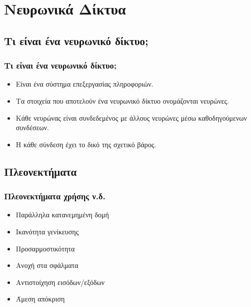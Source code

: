 \documentclass[xetex,serif,mathserif,14pt]{beamer}
\begin{document}

\section{Νευρωνικά Δίκτυα} %

\subsection{Τι είναι ένα νευρωνικό δίκτυο;}

\begin{frame}
\frametitle{Τι είναι ένα νευρωνικό δίκτυο;}
\begin{itemize}
  \item Είναι ένα σύστημα επεξεργασίας πληροφοριών.\pause
  \item Τα στοιχεία που αποτελούν ένα νευρωνικό δίκτυο ονομάζονται νευρώνες.\pause
  \item Κάθε νευρώνας είναι συνδεδεμένος με άλλους νευρώνες μέσω  καθοδηγούμενων  συνδέσεων.\pause
  \item  Η κάθε σύνδεση έχει το δικό της σχετικό βάρος.
\end{itemize}
\end{frame}


\subsection{Πλεονεκτήματα}

\begin{frame}
\frametitle{Πλεονεκτήματα χρήσης ν.δ.}
\begin{itemize}
  \item Παράλληλα κατανεμημένη δομή\pause
  \item Ικανότητα γενίκευσης\pause
  \item Προσαρμοστικότητα\pause
  \item Ανοχή στα σφάλματα\pause
  \item Αντιστοίχηση εισόδων/εξόδων\pause
  \item Άμεση απόκριση
\end{itemize}
\end{frame}

\end{document}
